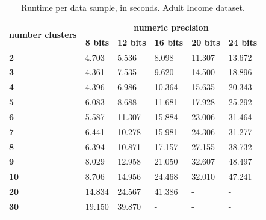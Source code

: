 \begin{table}[H]
\centering
\caption{Runtime per data sample, in seconds. Adult Income dataset.}
\label{table:runtimeKMAI}
\begin{tabular}{|l|l|l|l|l|l|}
\hline
\multirow{2}{*}{\textbf{number clusters}} & \multicolumn{5}{c|}{\textbf{numeric precision}}                                              \\ \cline{2-6}
                                          & \textbf{8 bits} & \textbf{12 bits} & \textbf{16 bits} & \textbf{20 bits} & \textbf{24 bits} \\ \hline
\textbf{2}                                & 4.703           & 5.536            & 8.098            & 11.307           & 13.672           \\ \hline
\textbf{3}                                & 4.361           & 7.535            & 9.620            & 14.500           & 18.896           \\ \hline
\textbf{4}                                & 4.396           & 6.986            & 10.364           & 15.635           & 20.343           \\ \hline
\textbf{5}                                & 6.083           & 8.688            & 11.681           & 17.928           & 25.292           \\ \hline
\textbf{6}                                & 5.587           & 11.307           & 15.884           & 23.006           & 31.464           \\ \hline
\textbf{7}                                & 6.441           & 10.278           & 15.981           & 24.306           & 31.277           \\ \hline
\textbf{8}                                & 6.394           & 10.871           & 17.157           & 27.155           & 38.732           \\ \hline
\textbf{9}                                & 8.029           & 12.958           & 21.050           & 32.607           & 48.497           \\ \hline
\textbf{10}                               & 8.706           & 14.956           & 24.468           & 32.010           & 47.241           \\ \hline
\textbf{20}                               & 14.834          & 24.567           & 41.386           & -                & -                \\ \hline
\textbf{30}                               & 19.150          & 39.870           & -                & -                & -                \\ \hline

\end{tabular}
\end{table}
